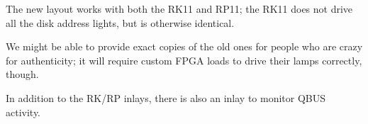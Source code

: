 The new layout works with both the RK11 and RP11; the RK11 does not drive all
the disk address lights, but is otherwise identical.

We might be able to provide exact copies of the old ones for people who are
crazy for authenticity; it will require custom FPGA loads to drive their
lamps correctly, though.

In addition to the RK/RP inlays, there is also an inlay to monitor QBUS
activity.

